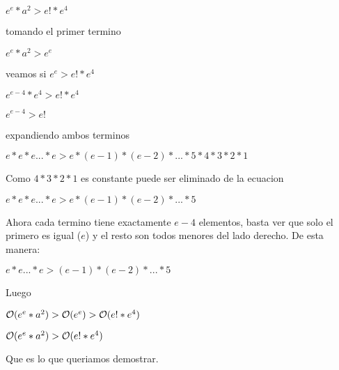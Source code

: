 \begin{center}
    $e^e * a^2 > e! * e^4$ \newline \newline
    
    tomando el primer termino \newline \newline
    
    $e^e * a^2 > e^e$ \newline \newline
    
    veamos si $e^e > e! * e^4$ \newline \newline
    
    $e^{e-4} * e^4 > e! * e^4$ \newline \newline
    
    $e^{e-4} > e!$ \newline \newline
    
    expandiendo ambos terminos \newline \newline
    
    $e * e * e ... * e > e * (e-1) * (e-2) * ... * 5 * 4 * 3 * 2 * 1$  \newline \newline
    
    Como $4*3*2*1$ es constante puede ser eliminado de la ecuacion \newline \newline
    
    $e * e * e ... * e > e * (e-1) * (e-2) * ... * 5$ \newline \newline
    
    Ahora cada termino tiene exactamente $e-4$ elementos, basta ver que solo el primero es igual ($e$) y el resto son todos menores del lado derecho. De esta manera: \newline \newline
    
    $e * e ... * e > (e-1) * (e-2) * ... * 5$ \newline \newline
    
    Luego  \newline \newline
    
    $\mathcal{O}(e^e * a^2) > \mathcal{O}(e^e) > \mathcal{O}(e! * e^4)$ \newline \newline
    
    $\mathcal{O}(e^e * a^2) > \mathcal{O}(e! * e^4)$ \newline \newline
    
    Que es lo que queriamos demostrar. \newline
    
\end{center}

